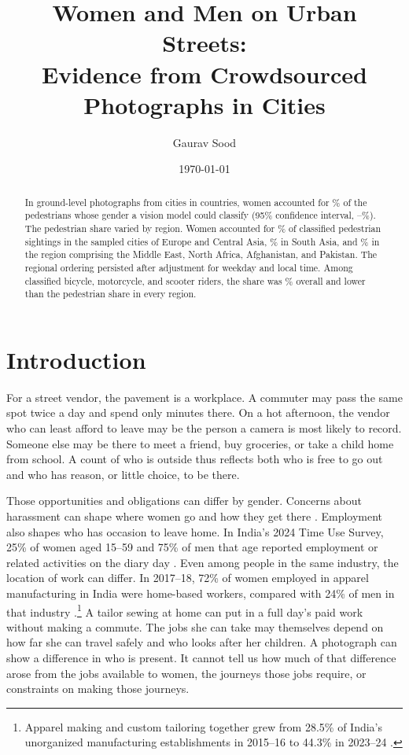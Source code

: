 \documentclass[11pt]{article}
\title{Women and Men on Urban Streets:\\
  Evidence from Crowdsourced Photographs in \TotalCities{} Cities}
\author{Gaurav Sood}
\date{\today}
\begin{document}
\maketitle

\begin{abstract}
\noindent In \TotalImages{} ground-level photographs from \TotalCities{} cities in \TotalCountries{} countries, women accounted for \GlobalPedShare\% of the pedestrians whose gender a vision model could classify (95\% confidence interval, \GlobalPedCILo--\GlobalPedCIHi\%). The pedestrian share varied by region. Women accounted for \ECAPedShare\% of classified pedestrian sightings in the sampled cities of Europe and Central Asia, \SouthAsiaPedShare\% in South Asia, and \MENAPedShare\% in the region comprising the Middle East, North Africa, Afghanistan, and Pakistan. The regional ordering persisted after adjustment for weekday and local time. Among classified bicycle, motorcycle, and scooter riders, the share was \GlobalTWShare\% overall and lower than the pedestrian share in every region.
\end{abstract}

\section{Introduction}
For a street vendor, the pavement is a workplace. A commuter may pass the same spot twice a day and spend only minutes there. On a hot afternoon, the vendor who can least afford to leave may be the person a camera is most likely to record. Someone else may be there to meet a friend, buy groceries, or take a child home from school. A count of who is outside thus reflects both who is free to go out and who has reason, or little choice, to be there.

Those opportunities and obligations can differ by gender. Concerns about harassment can shape where women go and how they get there \citep{phadke2011,borker2021safety,kondylis2025safespace}. Employment also shapes who has occasion to leave home. In India’s 2024 Time Use Survey, 25\% of women aged 15--59 and 75\% of men that age reported employment or related activities on the diary day \citep{nso2025timeuse}. Even among people in the same industry, the location of work can differ. In 2017--18, 72\% of women employed in apparel manufacturing in India were home-based workers, compared with 24\% of men in that industry \citep[Table~6]{raveendran2020home}.\footnote{Apparel making and custom tailoring together grew from 28.5\% of India’s unorganized manufacturing establishments in 2015--16 to 44.3\% in 2023--24 \citep[Table~3]{mohanan2025manufacturing}.} A tailor sewing at home can put in a full day’s paid work without making a commute. The jobs she can take may themselves depend on how far she can travel safely and who looks after her children. A photograph can show a difference in who is present. It cannot tell us how much of that difference arose from the jobs available to women, the journeys those jobs require, or constraints on making those journeys.
\end{document}
